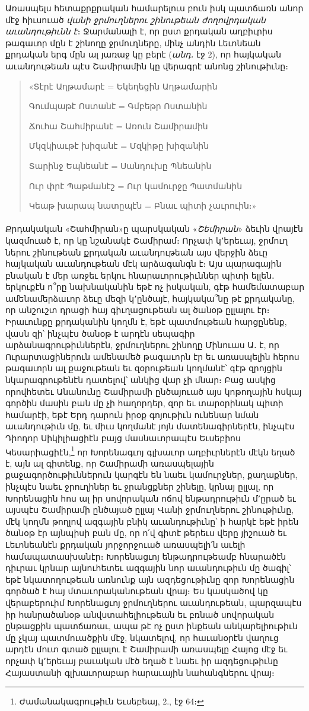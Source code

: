 \documentclass{article}
\begin{document}
{Առասպելս հետաքրքրական համարելուս բուն իսկ պատճառն անոր մէջ հիւսուած \emph{վանի ջրմուղներու շինութեան ժողովրդական աւանդութիւնն է}։ Ջարմանալի է, որ ըստ քրդական աղբիւրիս թագաւոր մըն է շինողը ջրմուղները, մինչ անդին Լեւոնեան քրդական երգ մըն ալ յառաջ կը բերէ (\emph{անդ․} էջ 2), որ հայկական աւանդութեան պէս Շամիրամին կը վերագրէ անոնց շինութիւնը։
\begin{quotation}
\arm
\small
«Տէրէ Աղթամարէ = Եկեղեցին Աղթամարին

Գումպաթէ Ոստանէ = Գմբեթր Ոստանին

Ճուհա Շահմիրանէ = Առուն Շամիրամին

Մկզկիաւթէ խիզանէ = Մզկիթը խիզանին

Տարինջ Եպնեանէ = Սանդուխը Պնեանին

Ուր փրէ Պաթմանէշ = Ուր կամուրջը Պատմանին

Կեաթ խարապ նատըպէն = Բնաւ պիտի չաւրուին։»
\end{quotation}
\paragraph{}
Քրդակական «Շահմիրան»ը պարսկական «\emph{Շեմիրան}» ձեւին վրայէն կազմուած է, որ կը նշանակէ Շամիրամ։ Որչափ կ՚երեւայ, ջրմուղ ներու շինութեան քրդական աւանդութեան այս վերջին ձեւը հայկական աւանդութեան մէկ արձագանգն է։ Այս պարագային բնական է մեր առջեւ երկու հնարաւորութիւններ պիտի ելլեն․ երկուքէն ո՞րը նախնականին եթէ ոչ իսկական, գէթ համեմատաբար ամենամերձաւոր ձեւը մեզի կ՚ընծայէ, հայկակա՞նը թէ քրդականը, որ անշուշտ դրացի հայ գիւղացութեան ալ ծանօթ ըլլալու էր։ Իրաւունքը քրդականին կողմն է, եթէ պատմութեան հարցընենք, վասն զի՝ ինչպէս ծանօթ է արդէն սեպագիր արձանագրութիւններէն, ջրմուղներու շինողը Մինուաս Ա․ է, որ Ուրարտացիներուն ամենամեծ թագաւորն էր եւ առասպելին հերոս թագաւորն ալ քաջութեան եւ զօրութեան կողմանէ՝ գէթ զրոյցին նկարագրութենէն դատելով՝ անկից վար չի մնար։ Բաց ասկից որովհետեւ Անանունը Շամիրամի ընծայուած այս կոթողային հսկայ գործին մասին բան մը չի հաղորդեր, զոր եւ տարօրինակ պիտի համարէի, եթէ Երդ դարուն իրօք գոյութիւն ունենար նման աւանդութիւն մը, եւ միւս կողմանէ յոյն մատենագիրներէն, ինչպէս Դիոդոր Սիկիլիացիէն բայց մասնաւորապէս Եւսեբիոս Կեսարիացիէն,\footnote{Ժամանակագրութիւն Եւսեբեայ, 2., էջ 64։} որ Խորենագւոյ գլխաւոր աղբիւրներէն մէկն եղած է, այն ալ գիտենք, որ Շամիրամի առասպելային քաջագործութիւններուն կարգէն են նաեւ կամուրջներ, քաղաքներ, ինչպէս նաեւ ջրուղիներ եւ ջրանցքներ շինելը, կրնայ ըլլալ, որ Խորենացին հոս ալ իր սովորական ոճով ենթադրութիւն մ՚ըրած եւ այսպէս Շամիրամի ընծայած ըլլայ Վանի ջրմուղներու շինութիւնը, մէկ կողմն թողլով ազգային բնիկ աւանդութիւնը՝ ի հարկէ եթէ իրեն ծանօթ էր այնպիսի բան մը, որ ո՛վ գիտէ թերեւս վերը յիշուած եւ Լեւոնեանէն քրդական յորջորջուած առասպելի՛ն աւելի համապատասխանէր։ Խորենացւոյ ենթադրութեամբ հնարածէն դիւրաւ կրնար այնուհետեւ ազգային նոր աւանդութիւն մը ծագիլ՝ եթէ նկատողութեան առնունք այն ազդեցութիւնը զոր Խորենացին գործած է հայ մտաւորականութեան վրայ։ Ես կասկածով կը վերաբերուիմ Խորենացւոյ ջրմուղներու աւանդութեան, պարզապէս իր հանրածանօթ անվստահելիութեան եւ բռնած սովորական ընթացքին պատճառաւ, ապա թէ ոչ ըստ ինքեան անկարելիութիւն մը չկայ պատմուածքին մէջ, նկատելով, որ հաւանօրէն վաղուց արդէն մուտ գտած ըլլալու է Շամիրամի առասպելը Հայոց մէջ եւ որչափ կ՚երեւայ բաւական մէծ եղած է նաեւ իր ազդեցութիւնը Հայաստանի գլխաւորաբար հարաւային նահանգներու վրայ։

}
\end{document}
